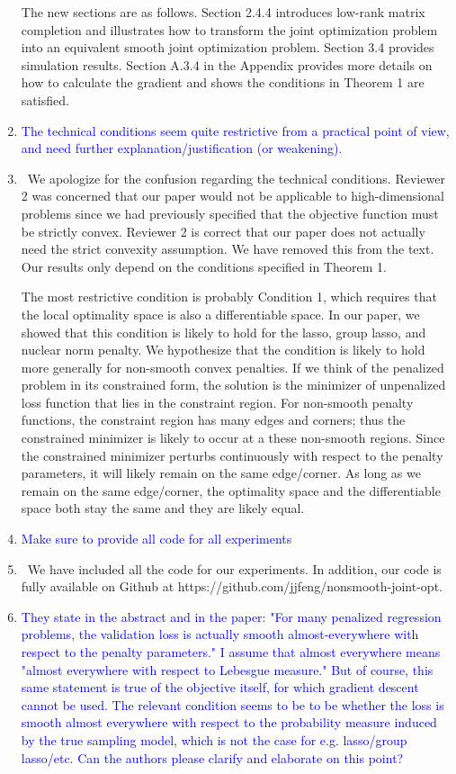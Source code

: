 \documentclass[]{article}
\newcommand{\point}[1]{\item \textcolor{blue}{#1}}
\newcommand{\reply}{\item[]\ }
\begin{document}
\begin{enumerate}
		The new sections are as follows. Section 2.4.4 introduces low-rank matrix completion and illustrates how to transform the joint optimization problem into an equivalent smooth joint optimization problem. Section 3.4 provides simulation results. Section A.3.4 in the Appendix provides more details on how to calculate the gradient and shows the conditions in Theorem 1 are satisfied. 
		
		
		\point{The technical conditions seem quite restrictive from a practical point of view, and need further explanation/justification (or weakening).}
		
		\reply We apologize for the confusion regarding the technical conditions. Reviewer 2 was concerned that our paper would not be applicable to high-dimensional problems since we had previously specified that the objective function must be strictly convex. Reviewer 2 is correct that our paper does not actually need the strict convexity assumption. We have removed this from the text. Our results only depend on the conditions specified in Theorem 1. 
		
		The most restrictive condition is probably Condition 1, which requires that the local optimality space is also a differentiable space. In our paper, we showed that this condition is likely to hold for the lasso, group lasso, and nuclear norm penalty. We hypothesize that the condition is likely to hold more generally for non-smooth convex penalties. If we think of the penalized problem in its constrained form, the solution is the minimizer of unpenalized loss function that lies in the constraint region. For non-smooth penalty functions, the constraint region has many edges and corners; thus the constrained minimizer is likely to occur at a these non-smooth regions. Since the constrained minimizer perturbs continuously with respect to the penalty parameters, it will likely remain on the same edge/corner. As long as we remain on the same edge/corner, the optimality space and the differentiable space both stay the same and they are likely equal.
		
		\point{Make sure to provide all code for all experiments}
		
		\reply We have included all the code for our experiments. In addition, our code is fully available on Github at https://github.com/jjfeng/nonsmooth-joint-opt.
		
		\point{They state in the abstract and in the paper: "For many penalized regression problems, the validation loss is actually smooth almost-everywhere with respect to the penalty parameters."  I assume that almost everywhere means "almost everywhere with respect to Lebesgue measure."  But of course, this same statement is true of the objective itself, for which gradient descent cannot be used.  The relevant condition seems to be to be whether the loss is smooth almost everywhere with respect to the probability measure induced by the true sampling model, which is not the case for e.g. lasso/group lasso/etc.  Can the authors please clarify and elaborate on this point?}
		

\end{enumerate}
\end{document}
